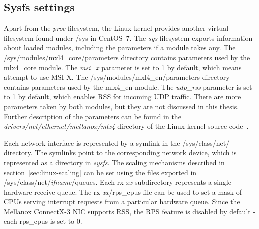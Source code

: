 
\subsection{Sysfs settings}\label{sub:analysis-settings-sysfs}
Apart from the {\it{proc}} filesystem, the Linux kernel provides another virtual filesystem found under /sys in CentOS~7.
The {\it{sys}} filesystem exports information about loaded modules, including the parameters if a module takes any.
The /sys/modules/mxl4\_core/parameters directory contains parameters used by the mlx4\_core module.
The {\it{msi\_x}} parameter is set to 1 by default, which means attempt to use MSI-X.
The /sys/modules/mxl4\_en/parameters directory contains parameters used by the mlx4\_en module.
The {\it{udp\_rss}} parameter is set to 1 by default, which enables RSS for incoming UDP traffic.
There are more parameters taken by both modules, but they are not discussed in this thesis.
Further description of the parameters can be found
in the {\it{drivers/net/ethernet/mellanox/mlx4}} directory of the Linux kernel source code~\cite{kernel-source}.

Each network interface is represented by a symlink in the /sys/class/net/ directory.
The symlinks point to the corresponding network device, which is represented as a directory in {\it{sysfs}}.
The scaling mechanisms described in section~\ref{sec:linux-scaling} can be set
using the files exported in /sys/class/net/{\it{ifname}}/queues.
Each rx-{\it{xx}} subdirectory represents a single hardware receive queue.
The rx-{\it{xx}}/rps\_cpus file can be used to set a mask of CPUs serving interrupt requests from a particular hardware queue.
Since the Mellanox ConnectX-3 NIC supports RSS, the RPS feature is disabled by default - each rps\_cpus is set to 0.


